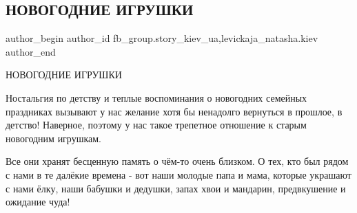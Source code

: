  
 
 
 
 
 
\subsection{НОВОГОДНИЕ ИГРУШКИ}
\label{sec:22_12_2021.fb.fb_group.story_kiev_ua.2.novogodnie_igrushki}
 
\ifcmt
 author_begin
   author_id fb_group.story_kiev_ua,levickaja_natasha.kiev
 author_end
\fi

НОВОГОДНИЕ ИГРУШКИ

Ностальгия по детству и теплые воспоминания о новогодних семейных праздниках
вызывают у нас желание хотя бы ненадолго вернуться в прошлое, в детство!
Наверное, поэтому у нас  такое трепетное отношение к старым новогодним
игрушкам.

Все они  хранят бесценную память  о чём-то  очень  близком. О тех, кто был
рядом с нами в те далёкие времена - вот наши молодые папа и мама, которые
украшают с нами ёлку, наши бабушки и дедушки, запах хвои и мандарин,
предвкушение и ожидание чуда! 

\begin{multicols}{2} %
\setlength{\parindent}{0pt}






\end{multicols} %

